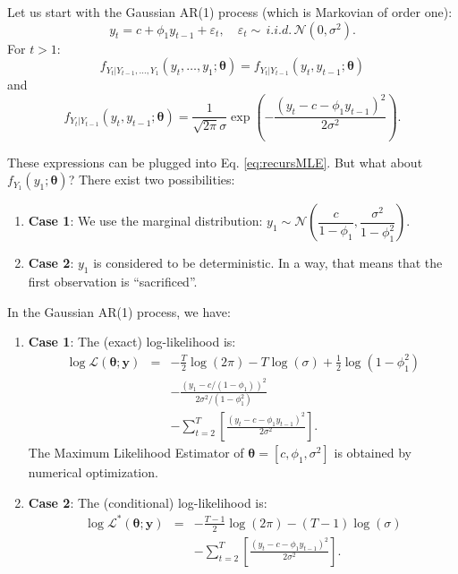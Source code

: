 \documentclass[
  12pt,
]{book}
\providecommand{\tightlist}{%
  \setlength{\itemsep}{0pt}\setlength{\parskip}{0pt}}
\theoremstyle{definition}
\theoremstyle{definition}
\theoremstyle{definition}
\theoremstyle{definition}
\theoremstyle{remark}
\begin{document}
Let us start with the Gaussian AR(1) process (which is Markovian of order one):
\[
y_t = c + \phi_1 y_{t-1} + \varepsilon_t, \quad \varepsilon_t \sim\,i.i.d.\, \mathcal{N}(0,\sigma^2).
\]
For \(t>1\):
\[
f_{Y_t|Y_{t-1},\dots,Y_1}(y_t,\dots,y_1;\boldsymbol\theta) = f_{Y_t|Y_{t-1}}(y_t,y_{t-1};\boldsymbol\theta)
\]
and
\[
f_{Y_t|Y_{t-1}}(y_t,y_{t-1};\boldsymbol\theta) = \frac{1}{\sqrt{2\pi}\sigma}\exp\left(-\frac{(y_t - c - \phi_1 y_{t-1})^2}{2\sigma^2}\right).
\]

These expressions can be plugged into Eq. \eqref{eq:recursMLE}. But what about \(f_{Y_1}(y_1;\boldsymbol\theta)\)? There exist two possibilities:

\begin{enumerate}
\def\labelenumi{\arabic{enumi}.}
\tightlist
\item
  \textbf{Case 1}: We use the marginal distribution: \(y_1 \sim \mathcal{N}\left(\dfrac{c}{1-\phi_1},\dfrac{\sigma^2}{1-\phi_1^2}\right)\).
\item
  \textbf{Case 2}: \(y_1\) is considered to be deterministic. In a way, that means that the first observation is ``sacrificed''.
\end{enumerate}

In the Gaussian AR(1) process, we have:

\begin{enumerate}
\def\labelenumi{\arabic{enumi}.}
\item
  \textbf{Case 1}: The (exact) log-likelihood is:
  \begin{eqnarray}
  \log \mathcal{L}(\boldsymbol\theta;\mathbf{y})  &=& - \frac{T}{2} \log(2\pi) - T\log(\sigma) + \frac{1}{2}\log(1-\phi_1^2)\nonumber \\
  && - \frac{(y_1 - c/(1-\phi_1))^2}{2\sigma^2/(1-\phi_1^2)}\\
  && - \sum_{t=2}^T \left[\frac{(y_t - c - \phi_1 y_{t-1})^2}{2\sigma^2} \right].
  \end{eqnarray}
  The Maximum Likelihood Estimator of \(\boldsymbol\theta= [c,\phi_1,\sigma^2]\) is obtained by numerical optimization.
\item
  \textbf{Case 2}: The (conditional) log-likelihood is:
  \begin{eqnarray}
  \log \mathcal{L}^*(\boldsymbol\theta;\mathbf{y})  &=& - \frac{T-1}{2} \log(2\pi) - (T-1)\log(\sigma)\nonumber\\
  && - \sum_{t=2}^T \left[\frac{(y_t - c - \phi_1 y_{t-1})^2}{2\sigma^2} \right].\label{eq:Lstar}
  \end{eqnarray}
\end{enumerate}
\end{document}
